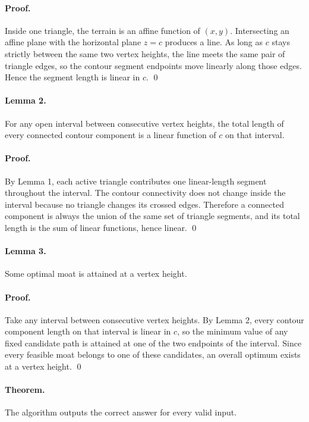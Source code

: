 \documentclass[11pt]{article}
\begin{document}
\paragraph{Proof.}
Inside one triangle, the terrain is an affine function of $(x,y)$. Intersecting an affine plane with the
horizontal plane $z=c$ produces a line. As long as $c$ stays strictly between the same two vertex heights,
the line meets the same pair of triangle edges, so the contour segment endpoints move linearly along
those edges. Hence the segment length is linear in $c$. \qed

\paragraph{Lemma 2.}
For any open interval between consecutive vertex heights, the total length of every connected contour
component is a linear function of $c$ on that interval.

\paragraph{Proof.}
By Lemma 1, each active triangle contributes one linear-length segment throughout the interval.
The contour connectivity does not change inside the interval because no triangle changes its crossed edges.
Therefore a connected component is always the union of the same set of triangle segments, and its total
length is the sum of linear functions, hence linear. \qed

\paragraph{Lemma 3.}
Some optimal moat is attained at a vertex height.

\paragraph{Proof.}
Take any interval between consecutive vertex heights. By Lemma 2, every contour component length on
that interval is linear in $c$, so the minimum value of any fixed candidate path is attained at one of the
two endpoints of the interval. Since every feasible moat belongs to one of these candidates, an overall
optimum exists at a vertex height. \qed

\paragraph{Theorem.}
The algorithm outputs the correct answer for every valid input.
\end{document}
